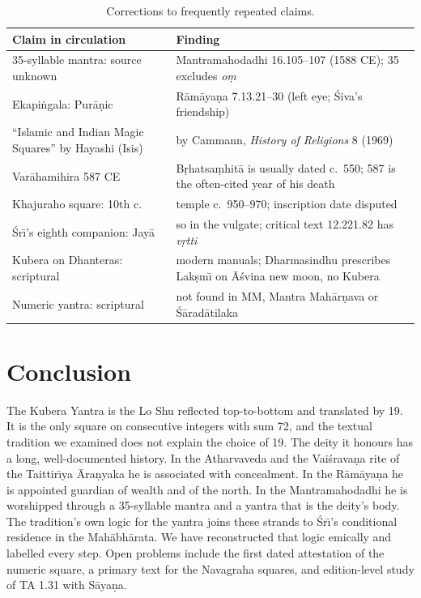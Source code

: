 \documentclass[pdflatex,sn-basic]{sn-jnl}
\theoremstyle{thmstyleone}
\theoremstyle{thmstylethree}
\begin{document}
\begin{table}[t]
\caption{Corrections to frequently repeated claims.}
\label{tab:corrections}
\centering\footnotesize
\setlength{\tabcolsep}{2pt}
\begin{tabular}{@{}p{}p{}@{}}
\toprule
Claim in circulation & Finding\\
\midrule
35-syllable mantra: source unknown & Mantramahodadhi 16.105--107 (1588 CE); 35 excludes \emph{o\d m}\\
Ekapi\.ngala: Pur\=a\d nic & R\=am\=aya\d na 7.13.21--30 (left eye; \'Siva's friendship)\\
``Islamic and Indian Magic Squares'' by Hayashi (Isis) & by Cammann, \emph{History of Religions} 8 (1969)\\
Var\=ahamihira 587 CE & B\d rhatsa\d mhit\=a is usually dated c.\ 550; 587 is the often-cited year of his death\\
Khajuraho square: 10th c. & temple c.\ 950--970; inscription date disputed\\
\'Sr\=\i{}'s eighth companion: Jay\=a & so in the vulgate; critical text 12.221.82 has \emph{v\d rtti}\\
Kubera on Dhanteras: scriptural & modern manuals; Dharmasindhu prescribes Lak\d sm\=\i{} on \=A\'svina new moon, no Kubera\\
Numeric yantra: scriptural & not found in MM, Mantra Mah\=ar\d nava or \'S\=arad\=atilaka\\
\bottomrule
\end{tabular}
\end{table}

\section{Conclusion}
The Kubera Yantra is the Lo Shu reflected top-to-bottom and translated by 19. It is the only square on consecutive integers with sum 72, and the textual tradition we examined does not explain the choice of 19. The deity it honours has a long, well-documented history. In the Atharvaveda and the Vai\'srava\d na rite of the Taittir\=\i ya \=Ara\d nyaka he is associated with concealment. In the R\=am\=aya\d na he is appointed guardian of wealth and of the north. In the Mantramahodadhi he is worshipped through a 35-syllable mantra and a yantra that is the deity's body. The tradition's own logic for the yantra joins these strands to \'Sr\=\i's conditional residence in the Mah\=abh\=arata. We have reconstructed that logic emically and labelled every step. Open problems include the first dated attestation of the numeric square, a primary text for the Navagraha squares, and edition-level study of TA 1.31 with S\=aya\d na.
\end{document}
